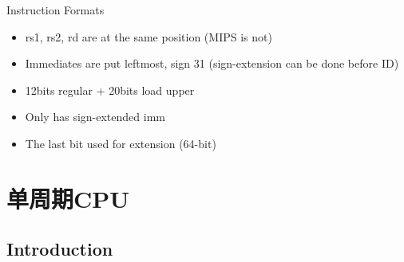 \documentclass[UTF8]{ctexbeamer}
\begin{document}
\begin{frame}{Instruction Formats}
\begin{itemize}
	\item rs1, rs2, rd are at the same position (MIPS is not)
	\item Immediates are put leftmost, sign 31 (sign-extension can be done before ID)
	\item 12bits regular + 20bits load upper
	\item Only has sign-extended imm
	\item The last bit used for extension (64-bit)
\end{itemize}
\end{frame}

\section{单周期CPU}
\begin{frame}
\sectionpage
\end{frame}

\subsection{Introduction}
\begin{frame}
\subsectionpage
\end{frame}
\end{document}
